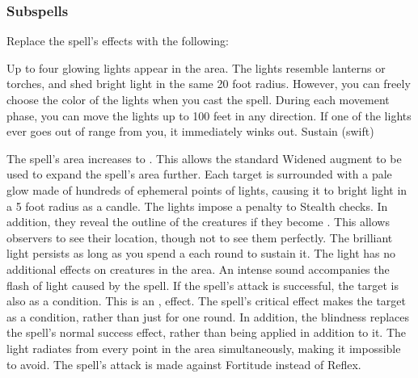 \subsubsection{Subspells}
Replace the spell's effects with the following:
\begin{spellcontent}
\begin{augmenteffects}
\spelleffect
Up to four glowing lights appear in the area.
The lights resemble lanterns or torches, and shed bright light in the same 20 foot radius.
However, you can freely choose the color of the lights when you cast the spell.
During each movement phase, you can move the lights up to 100 feet in any direction.
If one of the lights ever goes out of range from you, it immediately winks out.
\spelldur Sustain (swift)
\end{augmenteffects}
\end{spellcontent}
The spell's area increases to \areasmall.
This allows the standard Widened augment to be used to expand the spell's area further.
Each target is surrounded with a pale glow made of hundreds of ephemeral points of lights, causing it to bright light in a 5 foot radius as a candle.
The lights impose a  penalty to Stealth checks.
In addition, they reveal the outline of the creatures if they become .
This allows observers to see their location, though not to see them perfectly.
The brilliant light persists as long as you spend a  each round to sustain it.
The light has no additional effects on creatures in the area.
An intense sound accompanies the flash of light caused by the spell.
If the spell's attack is successful, the target is also \deafened as a condition.
This is an ,  effect.
The spell's critical effect makes the target \blinded as a condition, rather than just for one round.
In addition, the blindness replaces the spell's normal success effect, rather than being applied in addition to it.
The light radiates from every point in the area simultaneously, making it impossible to avoid.
The spell's attack is made against Fortitude instead of Reflex.
